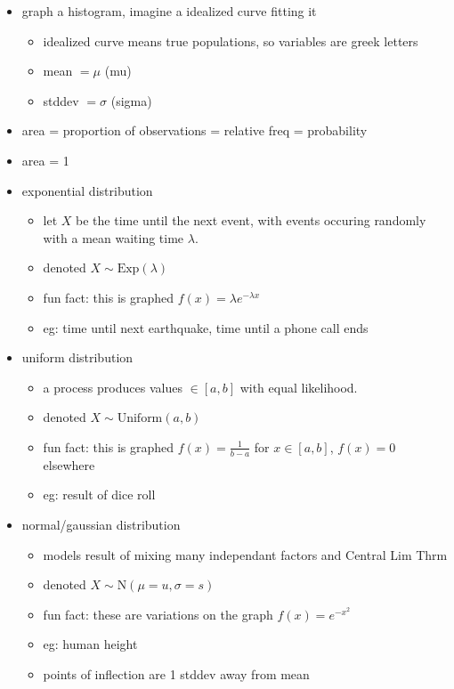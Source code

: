 \documentclass[11pt]{article}
\begin{document}
\begin{itemize}
  \begin{itemize}
    \item graph a histogram, imagine a idealized curve fitting it
    \begin{itemize}
      \item idealized curve means true populations, so variables are greek letters
      \item mean $= \mu$ (mu)
      \item stddev $= \sigma$ (sigma)
    \end{itemize}
    \item area = proportion of observations = relative freq = probability
    \item area = 1
    \item exponential distribution
    \begin{itemize}
      \item let $X$ be the time until the next event, with events occuring randomly with a mean waiting time $\lambda$.
      \item denoted $X \sim \text{Exp}(\lambda)$
      \item fun fact: this is graphed $f(x) = \lambda e^{-\lambda x}$
      \item eg: time until next earthquake, time until a phone call ends
    \end{itemize}
    \item uniform distribution
    \begin{itemize}
      \item a process produces values $\in [a,b]$ with equal likelihood.
      \item denoted $X \sim \text{Uniform}(a,b)$
      \item fun fact: this is graphed $f(x) = \frac{1}{b-a}$ for $x\in [a,b]$, $f(x) = 0$ elsewhere
      \item eg: result of dice roll
    \end{itemize}
    \item normal/gaussian distribution
    \begin{itemize}
      \item models result of mixing many independant factors and Central Lim Thrm
      \item denoted $X \sim \text{N}(\mu = u, \sigma = s)$
      \item fun fact: these are variations on the graph $f(x) = e^{-x^2}$
      \item eg: human height
      \item points of inflection are 1 stddev away from mean

\end{itemize}
\end{itemize}
\end{itemize}
\end{document}
